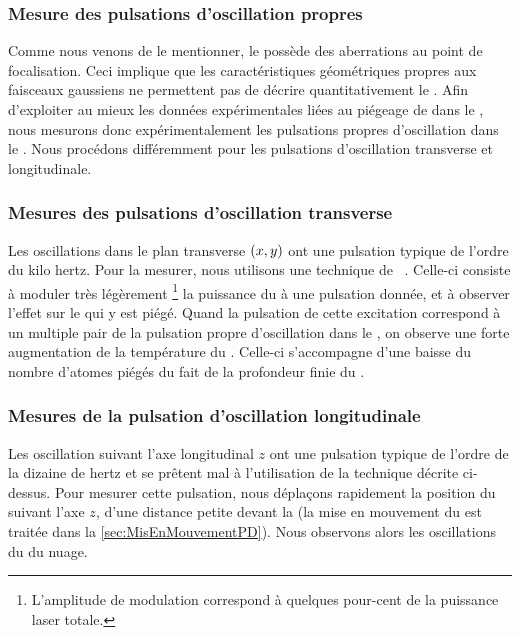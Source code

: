 
\subsubsection{Mesure des pulsations d'oscillation propres}
Comme nous venons de le mentionner, le \fld possède des aberrations au point de focalisation. Ceci implique que les caractéristiques géométriques propres aux faisceaux gaussiens ne permettent pas de décrire quantitativement le \pd.
Afin d'exploiter au mieux les données expérimentales liées au piégeage de \nat dans le \pd, nous mesurons donc expérimentalement les pulsations propres d'oscillation dans le \pd. Nous procédons différemment pour les pulsations d'oscillation transverse et longitudinale.

\subsubsection{Mesures des pulsations d'oscillation transverse}
Les oscillations dans le plan transverse $(x,y)$ ont une pulsation typique de l'ordre du kilo hertz. Pour la mesurer, nous utilisons une technique de ~\cite{Jau01}. Celle-ci consiste à moduler très légèrement %
\footnote{L'amplitude de modulation correspond à quelques pour-cent de la puissance laser totale.}
 la puissance du \fld à une pulsation donnée, et à observer l'effet sur le \nat qui y est piégé. Quand la pulsation de cette excitation correspond à un multiple pair de la pulsation propre d'oscillation dans le \pd, on observe une forte augmentation de la température du \n. Celle-ci s'accompagne d'une baisse du nombre d'atomes piégés du fait de la profondeur finie du \pd.

 

\subsubsection{Mesures de la pulsation d'oscillation longitudinale}
Les oscillation suivant l'axe longitudinal $z$ ont une pulsation typique de l'ordre de la dizaine de hertz et se prêtent mal à l'utilisation de la technique décrite ci-dessus. Pour mesurer cette pulsation, nous déplaçons rapidement la position du \pd suivant l'axe $z$, d'une distance petite devant la \ldr (la mise en mouvement du \pd est traitée dans la \autoref{sec:MisEnMouvementPD}). Nous observons alors les oscillations du \cdm du nuage.


